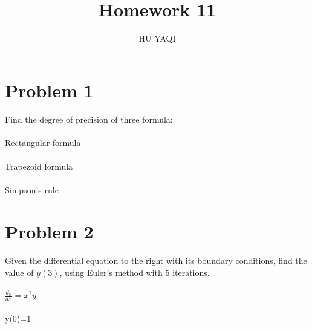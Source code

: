 \documentclass{article}
\title{ Homework 11 }
\author{HU YAQI}
\begin{document}
\maketitle
\setlength{\parindent}{0pt}
\section{ Problem 1 }
Find the degree of precision of three formula:\\
\\
Rectangular formula\\
\\
Trapezoid formula\\
\\
Simpson's rule
\section{ Problem 2 }
Given the differential equation to the right with its boundary conditions, find the value of $y(3)$, using Euler's method with 5 iterations.\\
\\
$\frac{dy}{dx}=x^2y$\\
\\
y(0)=1
\end{document}
